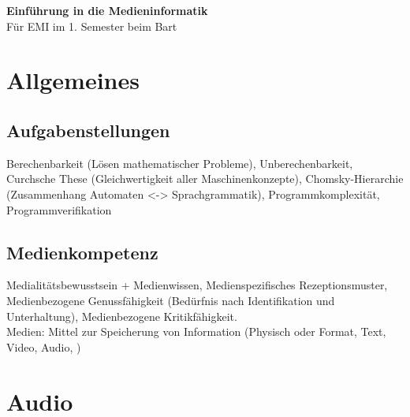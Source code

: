\documentclass[12pt,landscape]{article}
\begin{document}
\footnotesize
\begin{multicols}{3}
\begin{center}
     \Large{\textbf{Einführung in die Medieninformatik}} \\
     \small{Für EMI im 1. Semester beim Bart}
\end{center}


\section{Allgemeines}
\subsection{Aufgabenstellungen}
Berechenbarkeit (Lösen mathematischer Probleme), Unberechenbarkeit, Curchsche These (Gleichwertigkeit aller Maschinenkonzepte), Chomsky-Hierarchie (Zusammenhang Automaten <-> Sprachgrammatik), Programmkomplexität, Programmverifikation
\subsection{Medienkompetenz}
Medialitätsbewusstsein + Medienwissen, Medienspezifisches Rezeptionsmuster, Medienbezogene Genussfähigkeit (Bedürfnis nach Identifikation und Unterhaltung), Medienbezogene Kritikfähigkeit.\\
Medien: Mittel zur Speicherung von Information (Physisch oder Format, Text, Video, Audio, )


\section{Audio}

\end{multicols}
\end{document}
